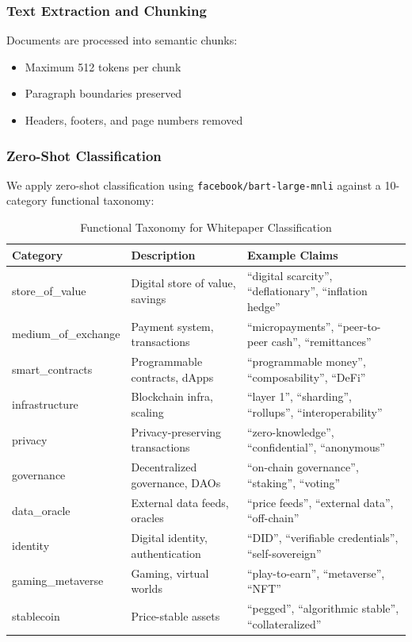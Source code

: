 \documentclass[11pt,twocolumn]{article}
\begin{document}
\subsubsection{Text Extraction and Chunking}

Documents are processed into semantic chunks:
\begin{itemize}[leftmargin=*]
    \item Maximum 512 tokens per chunk
    \item Paragraph boundaries preserved
    \item Headers, footers, and page numbers removed
\end{itemize}

\subsubsection{Zero-Shot Classification}

We apply zero-shot classification using \texttt{facebook/bart-large-mnli} against a 10-category functional taxonomy:

\begin{table}[htbp]
\footnotesize
\caption{Functional Taxonomy for Whitepaper Classification}
\label{tbl:taxonomy}
\begin{tabular}{@{}p{3.2cm}p{4.5cm}p{7cm}@{}}
\toprule
\textbf{Category} & \textbf{Description} & \textbf{Example Claims} \\
\midrule
store\_of\_value & Digital store of value, savings & ``digital scarcity'', ``deflationary'', ``inflation hedge'' \\
medium\_of\_exchange & Payment system, transactions & ``micropayments'', ``peer-to-peer cash'', ``remittances'' \\
smart\_contracts & Programmable contracts, dApps & ``programmable money'', ``composability'', ``DeFi'' \\
infrastructure & Blockchain infra, scaling & ``layer 1'', ``sharding'', ``rollups'', ``interoperability'' \\
privacy & Privacy-preserving transactions & ``zero-knowledge'', ``confidential'', ``anonymous'' \\
governance & Decentralized governance, DAOs & ``on-chain governance'', ``staking'', ``voting'' \\
data\_oracle & External data feeds, oracles & ``price feeds'', ``external data'', ``off-chain'' \\
identity & Digital identity, authentication & ``DID'', ``verifiable credentials'', ``self-sovereign'' \\
gaming\_metaverse & Gaming, virtual worlds & ``play-to-earn'', ``metaverse'', ``NFT'' \\
stablecoin & Price-stable assets & ``pegged'', ``algorithmic stable'', ``collateralized'' \\
\bottomrule
\end{tabular}
\end{table}
\end{document}
